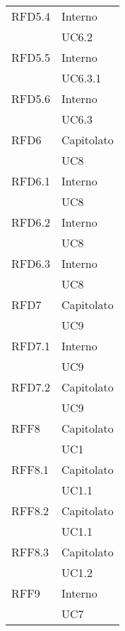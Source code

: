 \begin{center}
\begin{longtable}{ | >{\centering\arraybackslash}m{5cm} | >{\centering\arraybackslash}m{5cm} | }
        RFD5.4 & Interno\\
            & UC6.2 \\
\hline

        RFD5.5 & Interno\\
            & UC6.3.1 \\
\hline

        RFD5.6 & Interno\\
            & UC6.3 \\
\hline

        RFD6 & Capitolato\\
            & UC8 \\
\hline

        RFD6.1 & Interno\\
            & UC8 \\
\hline

        RFD6.2 & Interno\\
            & UC8 \\
\hline

        RFD6.3 & Interno\\
            & UC8 \\
\hline

        RFD7 & Capitolato\\
            & UC9 \\
\hline

        RFD7.1 & Interno\\
            & UC9 \\
\hline

        RFD7.2 & Capitolato\\
            & UC9 \\
\hline

        RFF8 & Capitolato\\
            & UC1 \\
\hline

        RFF8.1 & Capitolato\\
            & UC1.1 \\
\hline

        RFF8.2 & Capitolato\\
            & UC1.1 \\
\hline

        RFF8.3 & Capitolato\\
            & UC1.2 \\
\hline

        RFF9 & Interno\\
            & UC7 \\
\hline


\end{longtable}
\end{center}
